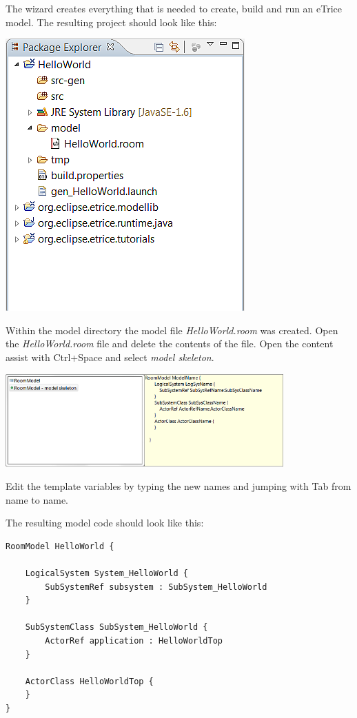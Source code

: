 The wizard creates everything that is needed to create, build and run an eTrice model. The resulting 
project should look like this:

\includegraphics{images/015-HelloWorld11.png}

Within the model directory the model file \textit{HelloWorld.room} was created. Open the 
\textit{HelloWorld.room} file and delete the contents of the file. Open the content assist with Ctrl+Space 
and select \textit{model skeleton}.

\includegraphics[width=0.8\textwidth]{images/015-HelloWorld12.png}

Edit the template variables by typing the new names and jumping with Tab from name to name.

The resulting model code should look like this:

\begin{verbatim}
RoomModel HelloWorld {

    LogicalSystem System_HelloWorld {
        SubSystemRef subsystem : SubSystem_HelloWorld
    }

    SubSystemClass SubSystem_HelloWorld {
        ActorRef application : HelloWorldTop
    }

    ActorClass HelloWorldTop {
    }
} 
\end{verbatim}

